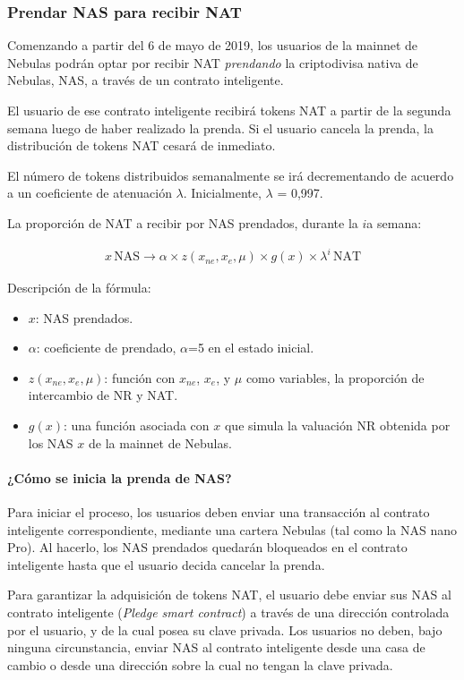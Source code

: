 \subsubsection{Prendar NAS para recibir NAT}

Comenzando a partir del 6 de mayo de 2019, los usuarios de la mainnet de Nebulas podrán optar por recibir NAT \emph{prendando} la criptodivisa nativa de Nebulas, NAS, a través de un contrato inteligente.

El usuario de ese contrato inteligente recibirá tokens NAT a partir de la segunda semana luego de haber realizado la prenda. Si el usuario cancela la prenda, la distribución de tokens NAT cesará de inmediato.

El número de tokens distribuidos semanalmente se irá decrementando de acuerdo a un coeficiente de atenuación $\lambda$. Inicialmente, $\lambda$ = 0,997.

La proporción de NAT a recibir por NAS prendados, durante la $i$a semana:

\begin{align}
x\,\text{NAS} \rightarrow \alpha \times z(x_{ne},x_{e},\mu)\times g(x) \times
  \lambda^{i}\,\text{NAT}
\end{align}

Descripción de la fórmula:

\begin{itemize}
	\item $x$: NAS prendados.
	\item $\alpha$: coeficiente de prendado, $\alpha$=5 en el estado inicial.
	\item $z(x_{ne},x_{e},\mu)$: función con $x_{ne}$, $x_{e}$, y $\mu$ como variables, la proporción de intercambio de NR y NAT.
	\item $g(x)$: una función asociada con $x$ que simula la valuación NR obtenida por los NAS $x$ de la mainnet de Nebulas.
\end{itemize}

\paragraph{¿Cómo se inicia la prenda de NAS?}
Para iniciar el proceso, los usuarios deben enviar una transacción al contrato inteligente correspondiente, mediante una cartera Nebulas (tal como la NAS nano Pro). Al hacerlo, los NAS prendados quedarán bloqueados en el contrato inteligente hasta que el usuario decida cancelar la prenda.

Para garantizar la adquisición de tokens NAT, el usuario debe enviar sus NAS al contrato inteligente (\textit{Pledge smart contract}) a través de una dirección controlada por el usuario, y de la cual posea su clave privada. Los usuarios no deben, bajo ninguna circunstancia, enviar NAS al contrato inteligente desde una casa de cambio o desde una dirección sobre la cual no tengan la clave privada.

